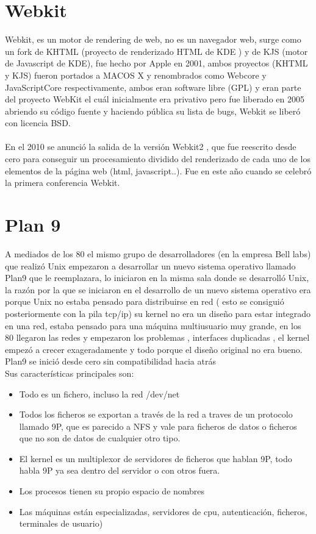 \documentclass[a4paper,oneside,11pt]{article}
\begin{document}
\section{Webkit}

Webkit, es un motor de rendering de web, no es un navegador web, surge como un fork de KHTML (proyecto de renderizado HTML de KDE )
 y de KJS (motor de Javascript de KDE), fue hecho por Apple en 2001, ambos proyectos (KHTML y KJS) fueron portados a MACOS X  y renombrados como Webcore y 
JavaScriptCore respectivamente, ambos eran software libre (GPL) y eran parte del proyecto WebKit el cu\'al inicialmente era privativo pero fue 
liberado en 2005 abriendo su c\'odigo fuente y haciendo p\'ublica su lista de bugs, Webkit se liber\'o con licencia BSD.\\
\\
En el 2010 se anunci\'o la salida de la versi\'on Webkit2 , que fue reescrito desde cero para conseguir un procesamiento dividido
del renderizado de cada uno de los elementos de la p\'agina web (html, javascript..). Fue en este año cuando se celebr\'o la primera 
conferencia Webkit.

\section{Plan 9}

A mediados de los 80 el mismo grupo de desarrolladores (en la empresa Bell labs) que realiz\'o Unix empezaron a desarrollar un nuevo sistema operativo llamado
Plan9 que le reemplazara, lo iniciaron en la misma sala donde se desarroll\'o Unix, la raz\'on por la que se iniciaron en el desarrollo
de un nuevo sistema operativo era porque Unix no estaba pensado para distribuirse en red ( esto se consigui\'o posteriormente con la pila tcp/ip)
su kernel no era un diseño para estar integrado en una red, estaba pensado para una m\'aquina
multiusuario muy grande, en los 80 llegaron las redes y empezaron los problemas , interfaces duplicadas , el kernel empez\'o a crecer exageradamente y todo porque el 
diseño original no era bueno.
\\
Plan9 se inici\'o desde cero sin compatibilidad hacia atr\'as
\\
Sus caracter\'isticas principales son:

\begin{itemize}  
	\item Todo es un fichero, incluso la red /dev/net
	\item Todos los ficheros se exportan a trav\'es de la red a traves de un protocolo llamado 9P, que es parecido
	 a NFS y vale para ficheros de datos o ficheros que no son de datos de cualquier otro tipo. 
	\item El kernel es un multiplexor de servidores  de ficheros que hablan  9P, todo habla 9P ya sea dentro del
	 servidor o con otros fuera.
	\item Los procesos tienen su propio espacio de nombres
	\item Las m\'aquinas están especializadas, servidores de cpu, autenticaci\'on, ficheros, terminales de usuario)
\end{itemize}
\end{document}
